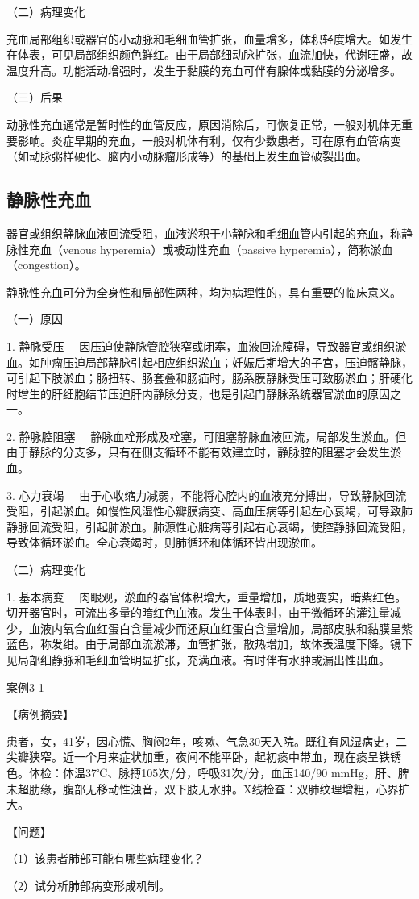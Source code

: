 {（二）病理变化}

充血局部组织或器官的小动脉和毛细血管扩张，血量增多，体积轻度增大。如发生在体表，可见局部组织颜色鲜红。由于局部细动脉扩张，血流加快，代谢旺盛，故温度升高。功能活动增强时，发生于黏膜的充血可伴有腺体或黏膜的分泌增多。

{（三）后果}

动脉性充血通常是暂时性的血管反应，原因消除后，可恢复正常，一般对机体无重要影响。炎症早期的充血，一般对机体有利，仅有少数患者，可在原有血管病变（如动脉粥样硬化、脑内小动脉瘤形成等）的基础上发生血管破裂出血。

\subsection{静脉性充血}

器官或组织静脉血液回流受阻，血液淤积于小静脉和毛细血管内引起的充血，称静脉性充血（venous
hyperemia）或被动性充血（passive hyperemia），简称淤血（congestion）。

静脉性充血可分为全身性和局部性两种，均为病理性的，具有重要的临床意义。

{（一）原因}

{1. 静脉受压}
　因压迫使静脉管腔狭窄或闭塞，血液回流障碍，导致器官或组织淤血。如肿瘤压迫局部静脉引起相应组织淤血；妊娠后期增大的子宫，压迫髂静脉，可引起下肢淤血；肠扭转、肠套叠和肠疝时，肠系膜静脉受压可致肠淤血；肝硬化时增生的肝细胞结节压迫肝内静脉分支，也是引起门静脉系统器官淤血的原因之一。

{2. 静脉腔阻塞}
　静脉血栓形成及栓塞，可阻塞静脉血液回流，局部发生淤血。但由于静脉的分支多，只有在侧支循环不能有效建立时，静脉腔的阻塞才会发生淤血。

{3. 心力衰竭}
　由于心收缩力减弱，不能将心腔内的血液充分搏出，导致静脉回流受阻，引起淤血。如慢性风湿性心瓣膜病变、高血压病等引起左心衰竭，可导致肺静脉回流受阻，引起肺淤血。肺源性心脏病等引起右心衰竭，使腔静脉回流受阻，导致体循环淤血。全心衰竭时，则肺循环和体循环皆出现淤血。

{（二）病理变化}

{1. 基本病变}
　肉眼观，淤血的器官体积增大，重量增加，质地变实，暗紫红色。切开器官时，可流出多量的暗红色血液。发生于体表时，由于微循环的灌注量减少，血液内氧合血红蛋白含量减少而还原血红蛋白含量增加，局部皮肤和黏膜呈紫蓝色，称发绀。由于局部血流淤滞，血管扩张，散热增加，故体表温度下降。镜下见局部细静脉和毛细血管明显扩张，充满血液。有时伴有水肿或漏出性出血。
\begin{framed}
{案例3-1}

{【病例摘要】}

患者，女，41岁，因心慌、胸闷2年，咳嗽、气急30天入院。既往有风湿病史，二尖瓣狭窄。近一个月来症状加重，夜间不能平卧，起初痰中带血，现在痰呈铁锈色。体检：体温37℃、脉搏105次/分，呼吸31次/分，血压140/90
mmHg，肝、脾未超肋缘，腹部无移动性浊音，双下肢无水肿。X线检查：双肺纹理增粗，心界扩大。

{【问题】}

（1）该患者肺部可能有哪些病理变化？

（2）试分析肺部病变形成机制。
\end{framed}

